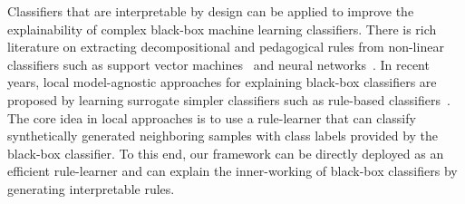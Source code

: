 Classifiers that are interpretable by design can be applied to improve the explainability of complex black-box machine learning classifiers. There is rich literature on extracting decompositional and pedagogical rules from non-linear classifiers such as support vector machines~\cite{barakat2004learning,barakat2005eclectic,diederich2008rule,martens2008rule,nunez2002rule} and neural networks~\cite{augasta2012rule,hailesilassie2016rule,setiono1995understanding,sato2001rule,zilke2016deepred,zhou2004rule}. In recent years, local model-agnostic approaches for explaining black-box classifiers  are  proposed by learning surrogate simpler classifiers such as rule-based classifiers~\cite{guidotti2018local,pastor2019explaining,rajapaksha2020lormika,ribeiro2018anchors}. The core idea in local approaches is to use a rule-learner that can classify synthetically generated neighboring samples with class labels provided by the black-box classifier. To this end, our framework {\imli} can be directly deployed as an efficient rule-learner and can explain the inner-working of black-box classifiers by generating interpretable rules.

